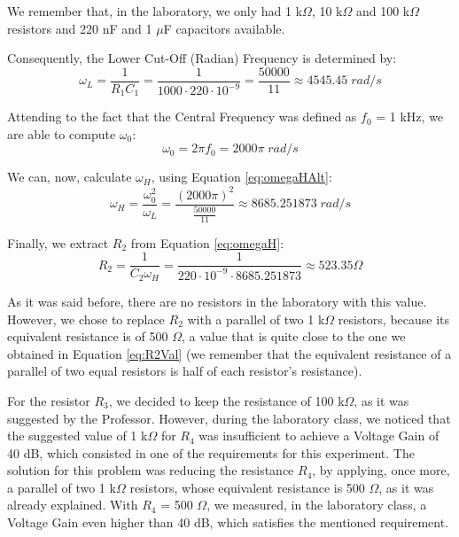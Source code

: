 We remember that, in the laboratory, we only had 1 k$\Omega$, 10 k$\Omega$ and 100 k$\Omega$ resistors and 220 nF and 1 $\mu$F capacitors available.

Consequently, the Lower Cut-Off (Radian) Frequency is determined by:
\begin{equation}
	\omega_L = \frac{1}{R_1 C_1} = \frac{1}{1000 \cdot 220 \cdot 10^{-9}} = \frac{50000}{11} \approx 4545.45 \;rad/s
	\label{eq:omegaLVal}
\end{equation}

Attending to the fact that the Central Frequency was defined as $f_0$ = 1 kHz, we are able to compute $\omega_0$:
\begin{equation}
	\omega_0 = 2 \pi f_0 = 2000 \pi \;rad/s
	\label{eq:omega0Val}
\end{equation}

We can, now, calculate $\omega_H$, using Equation \ref{eq:omegaHAlt}:
\begin{equation}
	\omega_H = \frac{\omega_0^2}{\omega_L} = \frac{(2000 \pi)^2}{\frac{50000}{11}} \approx 8685.251873 \;rad/s
	\label{eq:omegaHVal}
\end{equation}

Finally, we extract $R_2$ from Equation \ref{eq:omegaH}:
\begin{equation}
	R_2 = \frac{1}{C_2 \omega_H} = \frac{1}{220 \cdot 10^{-9} \cdot 8685.251873} \approx 523.35 \Omega
	\label{eq:R2Val}
\end{equation}

As it was said before, there are no resistors in the laboratory with this value. However, we chose to replace $R_2$ with a parallel of two 1 k$\Omega$ resistors, because its equivalent resistance is of 500 $\Omega$, a value that is quite close to the one we obtained in Equation \ref{eq:R2Val} (we remember that the equivalent resistance of a parallel of two equal resistors is half of each resistor's resistance).

For the resistor $R_3$, we decided to keep the resistance of 100 k$\Omega$, as it was suggested by the Professor. However, during the laboratory class, we noticed that the suggested value of 1 k$\Omega$ for $R_4$ was insufficient to achieve a Voltage Gain of 40 dB, which consisted in one of the requirements for this experiment. The solution for this problem was reducing the resistance $R_4$, by applying, once more, a parallel of two 1 k$\Omega$ resistors, whose equivalent resistance is 500 $\Omega$, as it was already explained. With $R_4$ = 500 $\Omega$, we measured, in the laboratory class, a Voltage Gain even higher than 40 dB, which satisfies the mentioned requirement.

